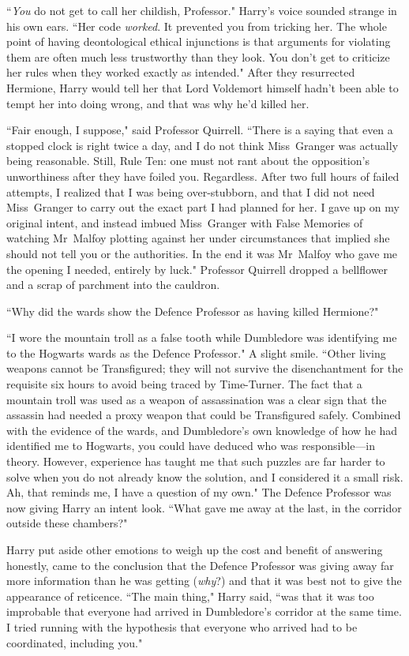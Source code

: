 ``\emph{You} do not get to call her childish, Professor." Harry's voice sounded strange in his own ears. ``Her code \emph{worked}. It prevented you from tricking her. The whole point of having deontological ethical injunctions is that arguments for violating them are often much less trustworthy than they look. You don't get to criticize her rules when they worked exactly as intended." After they resurrected Hermione, Harry would tell her that Lord Voldemort himself hadn't been able to tempt her into doing wrong, and that was why he'd killed her.

``Fair enough, I suppose," said Professor Quirrell. ``There is a saying that even a stopped clock is right twice a day, and I do not think Miss~Granger was actually being reasonable. Still, Rule Ten: one must not rant about the opposition's unworthiness after they have foiled you. Regardless. After two full hours of failed attempts, I realized that I was being over-stubborn, and that I did not need Miss~Granger to carry out the exact part I had planned for her. I gave up on my original intent, and instead imbued Miss~Granger with False Memories of watching Mr~Malfoy plotting against her under circumstances that implied she should not tell you or the authorities. In the end it was Mr~Malfoy who gave me the opening I needed, entirely by luck." Professor Quirrell dropped a bellflower and a scrap of parchment into the cauldron.

``Why did the wards show the Defence Professor as having killed Hermione?"

``I wore the mountain troll as a false tooth while Dumbledore was identifying me to the Hogwarts wards as the Defence Professor." A slight smile. ``Other living weapons cannot be Transfigured; they will not survive the disenchantment for the requisite six hours to avoid being traced by Time-Turner. The fact that a mountain troll was used as a weapon of assassination was a clear sign that the assassin had needed a proxy weapon that could be Transfigured safely. Combined with the evidence of the wards, and Dumbledore's own knowledge of how he had identified me to Hogwarts, you could have deduced who was responsible—in theory. However, experience has taught me that such puzzles are far harder to solve when you do not already know the solution, and I considered it a small risk. Ah, that reminds me, I have a question of my own." The Defence Professor was now giving Harry an intent look. ``What gave me away at the last, in the corridor outside these chambers?"

Harry put aside other emotions to weigh up the cost and benefit of answering honestly, came to the conclusion that the Defence Professor was giving away far more information than he was getting (\emph{why}?) and that it was best not to give the appearance of reticence. ``The main thing," Harry said, ``was that it was too improbable that everyone had arrived in Dumbledore's corridor at the same time. I tried running with the hypothesis that everyone who arrived had to be coordinated, including you."

